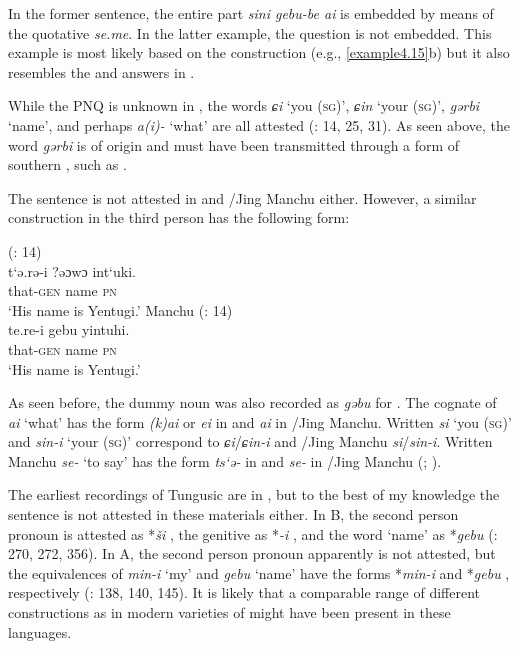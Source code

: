 \documentclass[output=paper,colorlinks,citecolor=brown]{langscibook}
\begin{document}
\noindent In the former sentence, the entire part \textit{sini gebu-be ai} is embedded by means of the quotative \textit{se.me}. In the latter example, the question is not embedded. This example is most likely based on the  construction (e.g., \ref{example4.15}b) but it also resembles the  and  answers in .

While the PNQ is unknown in , the words \textit{ɕi} ‘you (\textsc{sg})’, \textit{ɕin} ‘your (\textsc{sg})’, \textit{gərbi} ‘name’, and perhaps \textit{a(i)-} ‘what’ are all attested (\citealt{MuYejun1987H}: 14, 25, 31). As seen above, the word \textit{gərbi} is of  origin and must have been transmitted through a form of southern , such as .

The sentence is not attested in  and /Jing Manchu either. However, a similar construction in the third person has the following form:

\ea
    \label{example4.122}
     (\citealt{MuYejun1986H}: 14)\\
    \gll t‘ə.rə-i		?əɔwɔ	int‘uki.\\
    that-\textsc{gen}		name	\textsc{pn}\\
    \glt ‘His name is Yentugi.’
\ex
    \label{example4.123}
     Manchu (\citealt{AixinjueluoYingsheng1987a}: 14)\\
    \gll te.re-i		gebu	yintuhi.\\
    that-\textsc{gen}		name	\textsc{pn}\\
    \glt ‘His name is Yentugi.’
\z

\noindent As seen before, the dummy noun was also recorded as \textit{gəbu} for . The cognate of  \textit{ai} ‘what’ has the form \textit{(k)ai} or \textit{ei} in  and \textit{ai} in /Jing Manchu. Written  \textit{si} ‘you (\textsc{sg})’ and \textit{sin-i} ‘your (\textsc{sg})’ correspond to  \textit{ɕi}/\textit{ɕin-i} and /Jing Manchu \textit{si}/\textit{sin-i}. Written Manchu \textit{se-} ‘to say’ has the form \textit{ts‘ə-} in  and \textit{se-} in /Jing Manchu (\citealt{MuYejun1986H}; \citealt{AixinjueluoYingsheng1987a}).

The earliest recordings of Tungusic are in , but to the best of my knowledge the sentence is not attested in these materials either. In  B, the second person pronoun is attested as *\textit{ši} , the genitive as *\textit{-i} , and the word ‘name’ as *\textit{gebu}  (\citealt{Kane1989}: 270, 272, 356). In  A, the second person pronoun apparently is not attested, but the equivalences of  \textit{min-i} ‘my’ and \textit{gebu} ‘name’ have the forms *\textit{min-i}  and *\textit{gebu} , respectively (\citealt{Kiyose1977}: 138, 140, 145). It is likely that a comparable range of different constructions as in modern varieties of  might have been present in these languages.
\end{document}
